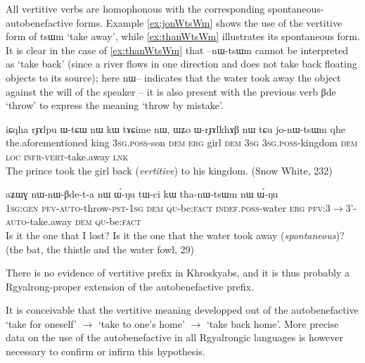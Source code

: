 \documentclass[oldfontcommands,oneside,a4paper,11pt]{article}
\newcommand{\ipa}[1]{{\phon \mbox{#1}}} %
\begin{document}
All vertitive verbs are homophonous with the corresponding spontaneous-autobenefactive forms. Example \ref{ex:jonWtsWm} shows the use of the vertitive form of \ipa{tsɯm} `take away', while \ref{ex:thanWtsWm} illustrates its spontaneous form. It is clear in the case of \ref{ex:thanWtsWm} that \ipa{--nɯ-tsɯm} cannot be interpreted as `take back' (since a river flows in one direction and does not take back floating objects to its source); here \ipa{nɯ--} indicates that the water took away the object against the will of the speaker -- it is also present with the previous verb \ipa{βde} `throw' to express the meaning `throw by mistake'.


\begin{exe}
\ex \label{ex:jonWtsWm}
\gll
\ipa{iɕqha} 	\ipa{rɟɤlpu} 	\ipa{ɯ-tɕɯ} 	\ipa{nɯ} 	\ipa{kɯ} 	\ipa{tɤɕime} 	\ipa{nɯ,} 	\ipa{ɯʑo} 	\ipa{ɯ-rɟɤlkhɤβ} 	\ipa{nɯ} 	\ipa{tɕu} 	\ipa{jo-nɯ-tsɯm} 	\ipa{qhe} \\
the.aforementioned king \textsc{3sg.poss}-son \textsc{dem} \textsc{erg} girl \textsc{dem} \textsc{3sg} \textsc{3sg.poss}-kingdom \textsc{dem} \textsc{loc} \textsc{infr-vert}-take.away \textsc{lnk} \\
\glt The prince took the girl back (\textit{vertitive}) to his kingdom. (Snow White, 232)
\end{exe}



\begin{exe}
\ex \label{ex:thanWtsWm}
\gll
\ipa{aʑɯɣ} 	\ipa{nɯ-nɯ-βde-t-a} 	\ipa{nɯ} 	\ipa{ɯ́-ŋu} 	\ipa{tɯ-ci} 	\ipa{kɯ} 	\ipa{tha-nɯ-tsɯm} 	\ipa{nɯ} 	\ipa{ɯ́-ŋu} \\
\textsc{1sg:gen} \textsc{pfv-auto}-throw-\textsc{pst-1sg} \textsc{dem} \textsc{qu}-be:\textsc{fact} \textsc{indef.poss}-water \textsc{erg} \textsc{pfv}:3$\rightarrow$3'-\textsc{auto}-take.away \textsc{dem} \textsc{qu}-be:\textsc{fact} \\
\glt Is it the one that I lost? Is it the one that the water took away (\textit{spontaneous})? (the bat, the thistle and the water fowl, 29)
\end{exe}


There is no evidence of vertitive prefix in Khroskyabs, and it is thus probably a Rgyalrong-proper extension of the autobenefactive prefix.


It is conceivable that the vertitive meaning developped out of the autobenefactive `take for oneself' $\rightarrow$ `take to one's home' $\rightarrow$ `take back home'. More precise data on the use of the autobenefactive in all Rgyalrongic languages is however necessary to confirm or infirm this hypothesis.
\end{document}
